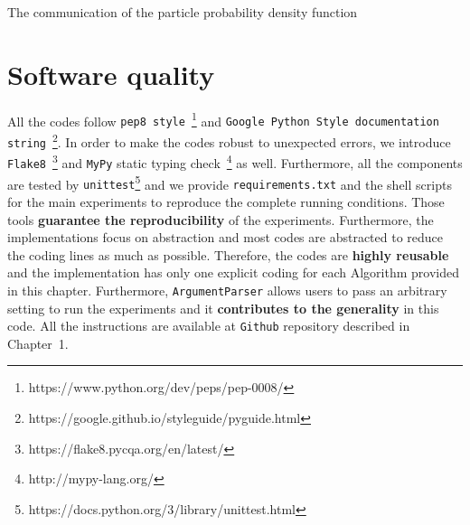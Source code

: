 \begin{algorithm}[b]
  \caption{The communication of
  the particle probability density function}
  \label{alg:mpi-algorithm}
  \begin{algorithmic}[1]
    \Indent
     
     
    \EndIf
    \EndIndent
    \EndFunction
  \end{algorithmic}
\end{algorithm}

\section{Software quality}
All the codes follow {\tt pep8 style}~\footnote{https://www.python.org/dev/peps/pep-0008/}
and {\tt Google Python Style documentation string}~\footnote{https://google.github.io/styleguide/pyguide.html}.
In order to make the codes robust to unexpected errors,
we introduce
{\tt Flake8}~\footnote{https://flake8.pycqa.org/en/latest/}
and {\tt MyPy} static typing check~\footnote{http://mypy-lang.org/} as well.
Furthermore, all the components are tested by
{\tt unittest}\footnote{https://docs.python.org/3/library/unittest.html}
and we provide {\tt requirements.txt}
and the shell scripts for the main experiments
to reproduce the complete running conditions.
Those tools {\bf guarantee the reproducibility} of the experiments.
Furthermore, the implementations focus on abstraction and
most codes are abstracted to reduce the coding lines as much as possible.
Therefore, the codes are {\bf highly reusable} and
the implementation has only one explicit coding for
each Algorithm provided in this chapter.
Furthermore, {\tt ArgumentParser} allows users to
pass an arbitrary setting to run the experiments
and it {\bf contributes to the generality} in this code.
All the instructions are available at {\tt Github} repository
described in Chapter~1.
